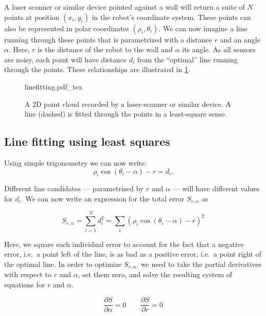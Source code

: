 A laser scanner or similar device pointed against a wall will return a suite of $N$ points at position $(x_i,y_i)$ in the robot's coordinate system. These points can also be represented in polar coordinates $ (\rho_i,\theta_i)$. We can now imagine a line running through these points that is parametrized with a distance $r$ and an angle $\alpha$. Here, $r$ is the distance of the robot to the wall and $ \alpha$ its angle. As all sensors are noisy, each point will have distance $d_i$ from the ``optimal'' line running through the points. These relationships are illustrated in \cref{fig:linefitting}.

\begin{figure}
	\centering
    \def\svgwidth{\textwidth}
    {linefitting.pdf_tex}
	\caption{A 2D point cloud recorded by a laser-scanner or similar device. A line (dashed) is fitted through the points in a least-square sense.}
	\label{fig:linefitting}
\end{figure}

\subsection{Line fitting using least squares}
Using simple trigonometry we can now write:
\begin{equation}
\rho_i \cos(\theta_i-\alpha)-r=d_i.
\end{equation}

Different line candidates --- parametrized by $ r$ and $ \alpha$ --- will have different values for $ d_i$. We can now write an expression for the total error $ S_{r,\alpha}$ as

\begin{equation}
S_{r,\alpha}=\sum_{i=1}^{N}{d_i^2}=\sum_i(\rho_i \cos(\theta_i-\alpha)-r)^2
\end{equation}

Here, we square each individual error to account for the fact that a negative error, i.e.\ a point left of the line, is as bad as a positive error, i.e.\ a point right of the optimal line. In order to optimize $ S_{r,\alpha}$, we need to take the partial derivatives with respect to $ r$ and $ \alpha$, set them zero, and solve the resulting system of equations for $ r$ and $ \alpha$.

\begin{equation}
\frac{\partial{S}}{\partial{\alpha}}=0 \qquad \frac{\partial{S}}{\partial{r}}=0
\end{equation}

